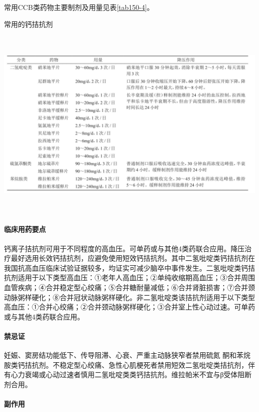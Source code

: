常用CCB类药物主要制剂及用量见表\ref{tab150-4}。

\begin{table}[htbp]
\centering
\caption{常用的钙拮抗剂}
\label{tab150-4}
\includegraphics[width=6.71875in,height=3.69792in]{./images/Image00559.jpg}
\end{table}

\paragraph{临床用药要点}

钙离子拮抗剂可用于不同程度的高血压。可单药或与其他4类药联合应用。降压治疗最好选用长效钙拮抗剂，应避免使用短效钙拮抗剂。其中二氢吡啶类钙拮抗剂在我国抗高血压临床试验证据较多，均证实可减少脑卒中事件发生。二氢吡啶类钙拮抗剂适用于以下类型高血压：①老年人高血压；②单纯收缩期高血压；③合并周围血管疾病；④合并稳定型心绞痛；⑤合并糖耐量减低；⑥合并肾脏损害；⑦合并颈动脉粥样硬化；⑧合并冠状动脉粥样硬化。非二氢吡啶类该拮抗剂适用于以下类型高血压：①合并心绞痛；②合并颈动脉粥样硬化；③合并室上性心动过速。可单药或与其他4类药联合应用。

\paragraph{禁忌证}

妊娠、窦房结功能低下、传导阻滞、心衰、严重主动脉狭窄者禁用硫氮{}
酮和苯烷胺类钙拮抗剂。不稳定型心绞痛、急性心肌梗死者禁用短效二氢吡啶类拮抗剂，伴有心力衰竭或心动过速者慎用二氢吡啶类类钙拮抗剂。维拉帕米不宜与β受体阻断剂合用。

\paragraph{副作用}

